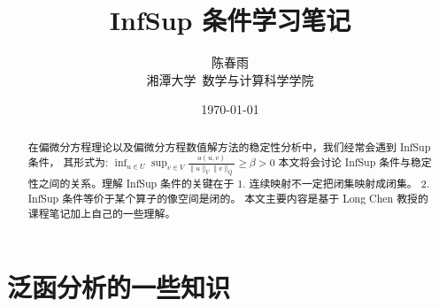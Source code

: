 \documentclass[lang=cn,a4paper,newtx]{elegantpaper}
\title{InfSup 条件学习笔记}
\author{陈春雨 \\ 湘潭大学\ 数学与计算科学学院}
\date{\today}
\begin{document}
\maketitle

\begin{abstract}
在偏微分方程理论以及偏微分方程数值解方法的稳定性分析中，我们经常会遇到 InfSup 条件，
其形式为:
$\inf_{u\in U}\sup_{v\in V}\frac{a(u, v)}{\|u\|_V\|v\|_Q}\geq \beta > 0$
本文将会讨论 InfSup 条件与稳定性之间的关系。理解 InfSup 条件的关键在于
1. 连续映射不一定把闭集映射成闭集。
2. InfSup 条件等价于某个算子的像空间是闭的。
本文主要内容是基于 Long Chen 教授的课程笔记加上自己的一些理解。
\end{abstract}

\section{泛函分析的一些知识}
\end{document}
